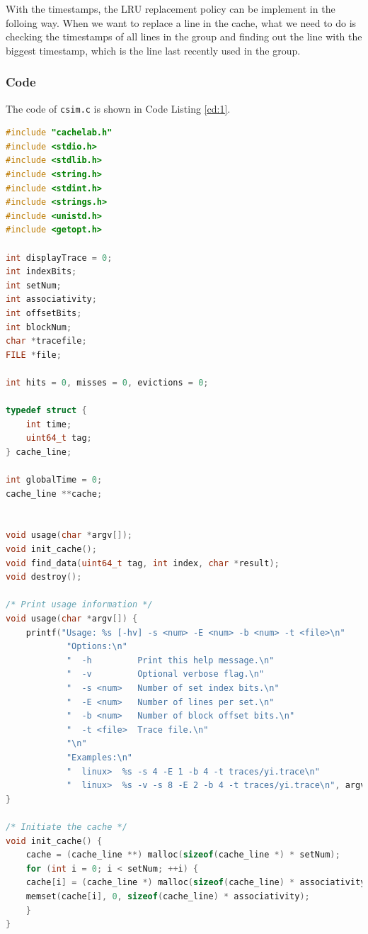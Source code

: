\documentclass{article}
\begin{document}
With the timestamps, the LRU replacement policy can be implement in the folloing way. When we want to replace a line in the cache, what we need to do is checking the timestamps of all lines in the group and finding out the line with the biggest timestamp, which is the line last recently used in the group.

\subsubsection{Code}

The code of \verb|csim.c| is shown in Code Listing \ref{cd:1}.

\begin{lstlisting}[language=c++, caption={csim.c}, label={cd:1}]
#include "cachelab.h"
#include <stdio.h>
#include <stdlib.h>
#include <string.h>
#include <stdint.h>
#include <strings.h>
#include <unistd.h>
#include <getopt.h>

int displayTrace = 0;
int indexBits;
int setNum;
int associativity;
int offsetBits;
int blockNum;
char *tracefile;
FILE *file;

int hits = 0, misses = 0, evictions = 0;

typedef struct {
    int time;
    uint64_t tag;
} cache_line;

int globalTime = 0;
cache_line **cache;


void usage(char *argv[]);
void init_cache();
void find_data(uint64_t tag, int index, char *result);
void destroy();

/* Print usage information */
void usage(char *argv[]) {
    printf("Usage: %s [-hv] -s <num> -E <num> -b <num> -t <file>\n"
            "Options:\n"
            "  -h         Print this help message.\n"
            "  -v         Optional verbose flag.\n"
            "  -s <num>   Number of set index bits.\n"
            "  -E <num>   Number of lines per set.\n"
            "  -b <num>   Number of block offset bits.\n"
            "  -t <file>  Trace file.\n"
            "\n"
            "Examples:\n"
            "  linux>  %s -s 4 -E 1 -b 4 -t traces/yi.trace\n"
            "  linux>  %s -v -s 8 -E 2 -b 4 -t traces/yi.trace\n", argv[0], argv[0], argv[0]);
}

/* Initiate the cache */
void init_cache() {
    cache = (cache_line **) malloc(sizeof(cache_line *) * setNum);
    for (int i = 0; i < setNum; ++i) {
    cache[i] = (cache_line *) malloc(sizeof(cache_line) * associativity);
    memset(cache[i], 0, sizeof(cache_line) * associativity);
    }
}



\end{lstlisting}
\end{document}
